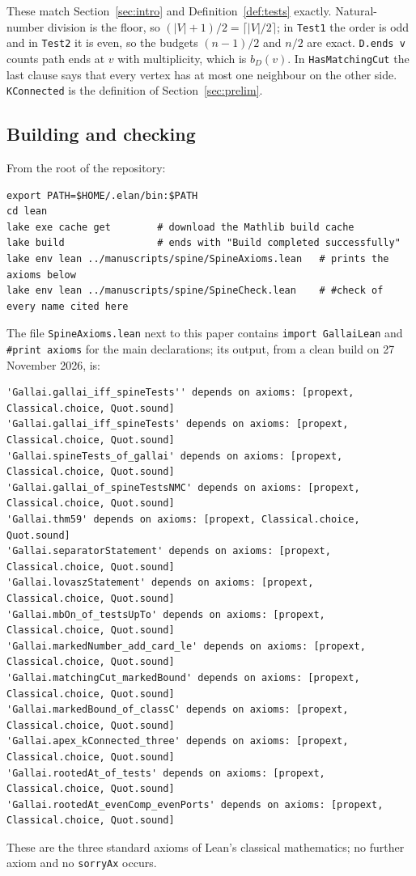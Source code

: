 \documentclass[11pt]{amsart}
\theoremstyle{definition}
\theoremstyle{remark}
\renewcommand{\_}{\oldunderscore\allowbreak}
\begin{document}
These match Section~\ref{sec:intro} and Definition~\ref{def:tests} exactly. Natural-number division
is the floor, so $(|V|+1)/2=\lceil|V|/2\rceil$; in \texttt{Test1} the order is odd and in
\texttt{Test2} it is even, so the budgets $(n-1)/2$ and $n/2$ are exact. \texttt{D.ends v} counts
path ends at $v$ with multiplicity, which is $b_D(v)$. In \texttt{HasMatchingCut} the last clause says
that every vertex has at most one neighbour on the other side. \texttt{KConnected} is the
definition of Section~\ref{sec:prelim}.

\subsection{Building and checking}
From the root of the repository:
{\footnotesize
\begin{verbatim}
export PATH=$HOME/.elan/bin:$PATH
cd lean
lake exe cache get        # download the Mathlib build cache
lake build                # ends with "Build completed successfully"
lake env lean ../manuscripts/spine/SpineAxioms.lean   # prints the axioms below
lake env lean ../manuscripts/spine/SpineCheck.lean    # #check of every name cited here
\end{verbatim}
}
The file \texttt{SpineAxioms.lean} next to this paper contains \texttt{import GallaiLean} and
\texttt{\#print axioms} for the main declarations; its output, from a clean build on 27 November
2026, is:
{\footnotesize
\begin{verbatim}
'Gallai.gallai_iff_spineTests'' depends on axioms: [propext, Classical.choice, Quot.sound]
'Gallai.gallai_iff_spineTests' depends on axioms: [propext, Classical.choice, Quot.sound]
'Gallai.spineTests_of_gallai' depends on axioms: [propext, Classical.choice, Quot.sound]
'Gallai.gallai_of_spineTestsNMC' depends on axioms: [propext, Classical.choice, Quot.sound]
'Gallai.thm59' depends on axioms: [propext, Classical.choice, Quot.sound]
'Gallai.separatorStatement' depends on axioms: [propext, Classical.choice, Quot.sound]
'Gallai.lovaszStatement' depends on axioms: [propext, Classical.choice, Quot.sound]
'Gallai.mbOn_of_testsUpTo' depends on axioms: [propext, Classical.choice, Quot.sound]
'Gallai.markedNumber_add_card_le' depends on axioms: [propext, Classical.choice, Quot.sound]
'Gallai.matchingCut_markedBound' depends on axioms: [propext, Classical.choice, Quot.sound]
'Gallai.markedBound_of_classC' depends on axioms: [propext, Classical.choice, Quot.sound]
'Gallai.apex_kConnected_three' depends on axioms: [propext, Classical.choice, Quot.sound]
'Gallai.rootedAt_of_tests' depends on axioms: [propext, Classical.choice, Quot.sound]
'Gallai.rootedAt_evenComp_evenPorts' depends on axioms: [propext, Classical.choice, Quot.sound]
\end{verbatim}
}
These are the three standard axioms of Lean's classical mathematics; no further axiom and no
\texttt{sorryAx} occurs.
\end{document}
